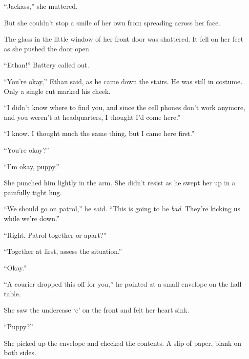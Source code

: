 ``Jackass,'' she muttered.



But she couldn't stop a smile of her own from spreading across her face.



\blacksquare



The glass in the little window of her front door was shattered.  It fell on her feet as she pushed the door open.



``Ethan!''  Battery called out.



``You're okay,'' Ethan said, as he came down the stairs.  He was still in costume.  Only a single cut marked his cheek.



``I didn't know where to find you, and since the cell phones don't work anymore, and you weren't at headquarters, I thought I'd come here.''



``I know.  I thought much the same thing, but I came here first.''



``You're okay?''



``I'm okay, puppy.''



She punched him lightly in the arm.  She didn't resist as he swept her up in a painfully tight hug.



``We should go on patrol,'' he said.  ``This is going to be \emph{bad}.  They're kicking us while we're down.''



``Right.  Patrol together or apart?''



``Together at first, assess the situation.''



``Okay.''



``A courier dropped this off for you,'' he pointed at a small envelope on the hall table.



She saw the undercase `c' on the front and felt her heart sink.



``Puppy?''



She picked up the envelope and checked the contents.  A slip of paper, blank on both sides.



